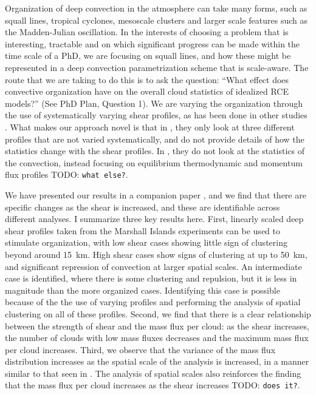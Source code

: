 \documentclass[11pt,a4paper]{article}
\newcommand{\todo}{TODO: \texttt}
\begin{document}
Organization of deep convection in the atmosphere can take many forms, such as squall lines, tropical cyclones, mesoscale clusters and larger scale features such as the Madden-Julian oscillation. In the interests of choosing a problem that is interesting, tractable and on which significant progress can be made within the time scale of a PhD, we are focusing on squall lines, and how these might be represented in a deep convection parametrization scheme that is scale-aware. The route that we are taking to do this is to ask the question: ``What effect does convective organization have on the overall cloud statistics of idealized RCE models?'' (See PhD Plan, Question 1). We are varying the organization through the use of systematically varying shear profiles, as has been done in other studies . What makes our approach novel is that in \cite{CC2006II}, they only look at three different profiles that are not varied systematically, and do not provide details of how the statistics change with the shear profiles. In \cite{RE2001}, they do not look at the statistics of the convection, instead focusing on equilibrium thermodynamic and momentum flux profiles \todo{what else?}. 

We have presented our results in a companion paper \parencite{muetz2017effects}, and we find that there are specific changes as the shear is increased, and these are identifiable across different analyses. I summarize three key results here. First, linearly scaled deep shear profiles taken from the Marshall Islands experiments \cite{yanai1973determination} can be used to stimulate organization, with low shear cases showing little sign of clustering beyond around \SI{15}{km}. High shear cases show signs of clustering at up to \SI{50}{km}, and significant repression of convection at larger spatial scales. An intermediate case is identified, where there is some clustering and repulsion, but it is less in magnitude than the more organized cases. Identifying this case is possible because of the the use of varying profiles and performing the analysis of spatial clustering on all of these profiles. Second, we find that there is a clear relationship between the strength of shear and the mass flux per cloud: as the shear increases, the number of clouds with low mass fluxes decreases and the maximum mass flux per cloud increases. Third, we observe that the variance of the mass flux distribution increases as the spatial scale of the analysis is increased, in a manner similar to that seen in \cite{plant2008stochastic}. The analysis of spatial scales also reinforces the finding that the mass flux per cloud increases as the shear increases \todo{does it?}.
\end{document}
